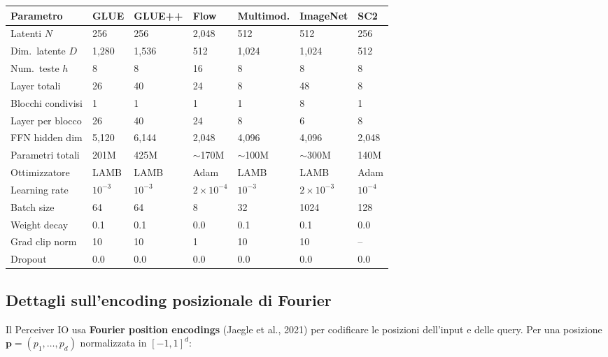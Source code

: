 \documentclass[12pt,a4paper]{article}
\begin{document}
\begin{center}
\footnotesize
\begin{tabular}{p{2.5cm}p{1.5cm}p{1.5cm}p{1.5cm}p{1.5cm}p{1.5cm}p{1.5cm}}
\toprule
\textbf{Parametro} & \textbf{GLUE} & \textbf{GLUE++} & \textbf{Flow} & \textbf{Multimod.} & \textbf{ImageNet} & \textbf{SC2} \\
\midrule
Latenti $N$ & 256 & 256 & 2,048 & 512 & 512 & 256 \\
Dim.\ latente $D$ & 1,280 & 1,536 & 512 & 1,024 & 1,024 & 512 \\
Num.\ teste $h$ & 8 & 8 & 16 & 8 & 8 & 8 \\
Layer totali & 26 & 40 & 24 & 8 & 48 & 8 \\
Blocchi condivisi & 1 & 1 & 1 & 1 & 8 & 1 \\
Layer per blocco & 26 & 40 & 24 & 8 & 6 & 8 \\
FFN hidden dim & 5,120 & 6,144 & 2,048 & 4,096 & 4,096 & 2,048 \\
Parametri totali & 201M & 425M & $\sim$170M & $\sim$100M & $\sim$300M & 140M \\
\midrule
Ottimizzatore & LAMB & LAMB & Adam & LAMB & LAMB & Adam \\
Learning rate & $10^{-3}$ & $10^{-3}$ & $2\!\times\!10^{-4}$ & $10^{-3}$ & $2\!\times\!10^{-3}$ & $10^{-4}$ \\
Batch size & 64 & 64 & 8 & 32 & 1024 & 128 \\
Weight decay & 0.1 & 0.1 & 0.0 & 0.1 & 0.1 & 0.0 \\
Grad clip norm & 10 & 10 & 1 & 10 & 10 & -- \\
Dropout & 0.0 & 0.0 & 0.0 & 0.0 & 0.0 & 0.0 \\
\bottomrule
\end{tabular}
\end{center}

\subsection{Dettagli sull'encoding posizionale di Fourier}

Il Perceiver IO usa \textbf{Fourier position encodings} (Jaegle et al., 2021) per codificare le posizioni dell'input e delle query. Per una posizione $\mathbf{p} = (p_1, \ldots, p_d)$ normalizzata in $[-1, 1]^d$:
\end{document}

